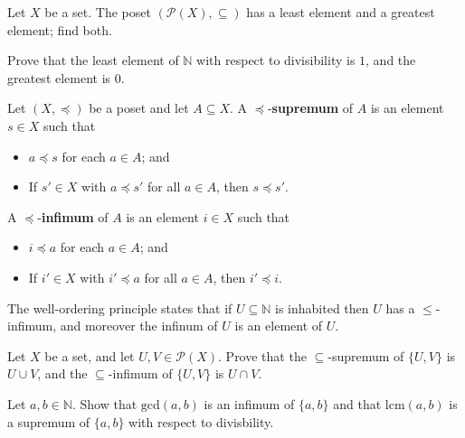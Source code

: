 \begin{exercise}
Let $X$ be a set. The poset $(\mathcal{P}(X), \subseteq)$ has a least element and a greatest element; find both.
\end{exercise}

\begin{exercise}
Prove that the least element of $\mathbb{N}$ with respect to divisibility is $1$, and the greatest element is $0$.
\end{exercise}

\begin{definition}[Supremum]
\label{defSupremumInfimum}
Let $(X, \preceq)$ be a poset and let $A \subseteq X$. A $\preceq$-\textbf{supremum} of $A$ is an element $s \in X$ such that
\begin{itemize}
\item $a \preceq s$ for each $a \in A$; and
\item If $s' \in X$ with $a \preceq s'$ for all $a \in A$, then $s \preceq s'$.
\end{itemize}
A $\preceq$-\textbf{infimum} of $A$ is an element $i \in X$ such that
\begin{itemize}
\item $i \preceq a$ for each $a \in A$; and
\item If $i' \in X$ with $i' \preceq a$ for all $a \in A$, then $i' \preceq i$.
\end{itemize}
\end{definition}

\begin{example}
The well-ordering principle states that if $U \subseteq \mathbb{N}$ is inhabited then $U$ has a $\le$-infimum, and moreover the infinum of $U$ is an element of $U$.
\end{example}

\begin{exercise}
Let $X$ be a set, and let $U,V \in \mathcal{P}(X)$. Prove that the $\subseteq$-supremum of $\{ U, V \}$ is $U \cup V$, and the $\subseteq$-infimum of $\{ U, V \}$ is $U \cap V$.
\end{exercise}

\begin{exercise}
Let $a,b \in \mathbb{N}$. Show that $\mathrm{gcd}(a,b)$ is an infimum of $\{ a, b \}$ and that $\mathrm{lcm}(a,b)$ is a supremum of $\{ a, b \}$ with respect to divisbility.
\end{exercise}


